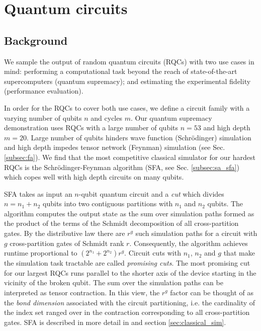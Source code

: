 \section{Quantum circuits}\label{sec:circuits}

\subsection{Background}
We sample the output of random quantum circuits (RQCs) with two use cases in mind: performing a computational task beyond the reach of state-of-the-art supercomputers (quantum supremacy); and estimating the experimental fidelity (performance evaluation).

In order for the RQCs to cover both use cases, we define a circuit family with a varying number of qubits $n$ and cycles $m$. Our quantum supremacy demonstration uses RQCs with a large number of qubits $n = 53$ and high depth $m = 20$. Large number of qubits hinders wave function (Schr\"odinger) simulation and high depth impedes tensor network (Feynman) simulation (see Sec. \ref{subsec:fa}). We find that the most competitive classical simulator for our hardest RQCs is the Schr\"odinger-Feynman algorithm (SFA, see Sec. \ref{subsec:sa_sfa}) which copes well with high depth circuits on many qubits.

SFA takes as input an $n$-qubit quantum circuit and a \textit{cut} which divides $n = n_1 + n_2$ qubits into two contiguous partitions with $n_1$ and $n_2$ qubits. The algorithm computes the output state as the sum over simulation paths formed as the product of the terms of the Schmidt decomposition of all cross-partition gates. By the distributive law there are $r^g$ such simulation paths for a circuit with $g$ cross-partition gates of Schmidt rank $r$. Consequently, the algorithm achieves runtime proportional to $(2^{n_1} + 2^{n_2}) r^g$. Circuit cuts with $n_1$, $n_2$ and $g$ that make the simulation task tractable are called \textit{promising cuts}. The most promising cut for our largest RQCs runs parallel to the shorter axis of the device starting in the vicinity of the broken qubit. The sum over the simulation paths can be interpreted as tensor contraction. In this view, the $r^g$ factor can be thought of as the \textit{bond dimension} associated with the circuit partitioning, i.e. the cardinality of the index set ranged over in the contraction corresponding to all cross-partition gates. SFA is described in more detail in \cite{markov_quantum_2018} and section \ref{sec:classical_sim}.

